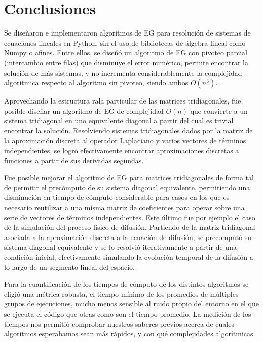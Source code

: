 \section{Conclusiones}

Se diseñaron e implementaron algoritmos de EG para resolución de sistemas de ecuaciones lineales en Python, sin el uso de bibliotecas de álgebra lineal como Numpy o afines. Entre ellos, se diseñó un algoritmo de EG con pivoteo parcial (intercambio entre filas) que disminuye el error numérico, permite encontrar la solución de más sistemas, y no incrementa considerablemente la complejidad algoritmica respecto al algoritmo sin pivoteo, siendo ambos $O(n^3)$.

Aprovechando la estructura rala particular de las matrices tridiagonales, fue posible diseñar un algoritmo de EG de complejidad $O(n)$ que convierte a un sistema tridiagonal en uno equivalente diagonal a partir del cual es trivial encontrar la solución. Resolviendo sistemas tridiagonales dados por la matriz de la aproximación discreta al operador Laplaciano y varios vectores de términos independientes, se logró efectivamente encontrar aproximaciones discretas a funciones a partir de sus derivadas segundas.

Fue posible mejorar el algoritmo de EG para matrices tridiagonales de forma tal de permitir el precómputo de su sistema diagonal equivalente, permitiendo una disminución en tiempo de cómputo considerable para casos en los que es necesario reutilizar a una misma matriz de coeficientes para operar sobre una serie de vectores de términos independientes. Este último fue por ejemplo el caso de la simulación del proceso físico de difusión. Partiendo de la matriz tridiagonal asociada a la aproximación discreta a la ecuación de difusión, se precomputó su sistema diagonal equivalente y se lo resolvió iterativamente a partir de una condición inicial, efectivamente simulando la evolución temporal de la difusión a lo largo de un segmento lineal del espacio.

Para la cuantificación de los tiempos de cómputo de los distintos algoritmos se eligió una métrica robusta, el tiempo mínimo de los promedios de múltiples grupos de ejecuciones, mucho menos sensible al ruido propio del entorno en el que se ejecuta el código que otras como son el tiempo promedio. La medición de los tiempos nos permitió comprobar nuestros saberes previos acerca de cuales algoritmos esperabamos sean más rápidos, y con qué complejidades algorítmicas.